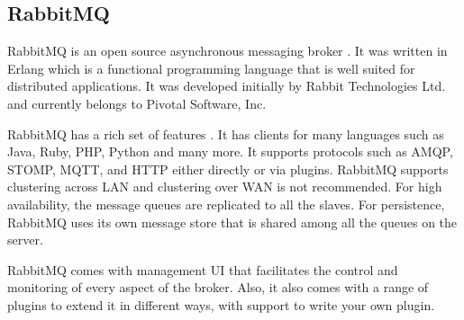 \subsection{RabbitMQ}

RabbitMQ is an open source asynchronous messaging broker \parencite{richardson2008introduction}. It was written in Erlang which is a functional programming language that is well suited for distributed applications. It was developed initially by Rabbit Technologies Ltd. and currently belongs to Pivotal Software, Inc.

RabbitMQ has a rich set of features \parencite{rabbitmq_features}. It has clients for many languages such as Java, Ruby, PHP, Python and many more. It supports protocols such as AMQP, STOMP, MQTT, and HTTP either directly or via plugins. RabbitMQ supports clustering across LAN and clustering over WAN is not recommended. For high availability, the message queues are replicated to all the slaves. For persistence, RabbitMQ uses its own message store that is shared among all the queues on the server. 

RabbitMQ comes with management UI that facilitates the control and monitoring of every aspect of the broker. Also, it also comes with a range of plugins to extend it in different ways, with support to write your own plugin.
